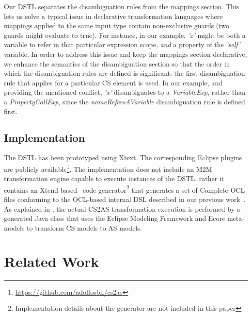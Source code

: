 \documentclass{llncs}
\begin{document}
Our DSTL separates the disambiguation rules from the mappings section. This lets us solve a typical issue in declarative transformation languages where mappings applied to the same input type contain non-exclusive guards (two guards might evaluate to true).
For instance, in our example, \textit{'x'} might be both a variable to refer in that particular expression scope, \textit{and} a property of the \textit{'self'} variable. In order to address this issue and keep the mappings section declarative, we enhance the semantics of the disambiguation section so that the order in which the disambiguation rules are defined is significant: the first disambiguation rule that applies for a particular CS element is used. In our example, and providing the mentioned conflict, \textit{'x'} disambiguates to a \textit{VariableExp}, rather than a \textit{PropertyCallExp}, since the \textit{nameRefersAVariable} disambiguation rule is defined first.

\subsection{Implementation}

The DSTL has been prototyped using Xtext. The corresponding Eclipse plugins are publicly available\footnote{\url{https://github.com/adolfosbh/cs2as}}. The implementation does not include an M2M transformation engine capable to execute instances of the DSTL, rather it contains an Xtend-based~\cite{xtend} code generator\footnote{Implementation details about the generator are not included in this paper} that generates a set of Complete OCL files conforming to the OCL-based internal DSL described in our previous work~\cite{sanchez2015oclCS2AS}. As explained in \cite{sanchez2015oclCS2AS}, the actual CS2AS transformation execution is performed by a generated Java class that uses the Eclipse Modeling Framework and Ecore meta-models to transform CS models to AS models.

\section{Related Work}
\label{sec:relatedWork}
\end{document}

